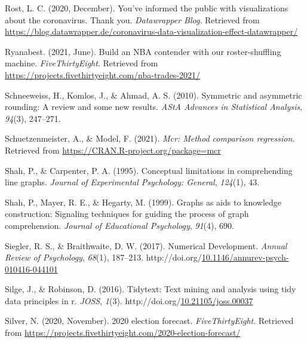 \documentclass[print]{nuthesis}
\newlength{\cslhangindent}
\newenvironment{CSLReferences}%
{\setlength{\parindent}{0pt}%
\everypar{\setlength{\hangindent}{\cslhangindent}}\ignorespaces}%
{\par}
\begin{document}
\begin{CSLReferences}{1}{0}
\leavevmode{}%
Rost, L. C. (2020, December). You've informed the public with visualizations about the coronavirus. Thank you. \emph{Datawrapper Blog}. Retrieved from \url{https://blog.datawrapper.de/coronavirus-data-visualization-effect-datawrapper/}

\leavevmode{}%
Ryanabest. (2021, June). Build an NBA contender with our roster-shuffling machine. \emph{FiveThirtyEight}. Retrieved from \url{https://projects.fivethirtyeight.com/nba-trades-2021/}

\leavevmode{}%
Schneeweiss, H., Komlos, J., \& Ahmad, A. S. (2010). Symmetric and asymmetric rounding: A review and some new results. \emph{AStA Advances in Statistical Analysis}, \emph{94}(3), 247--271.

\leavevmode{}%
Schuetzenmeister, A., \& Model, F. (2021). \emph{Mcr: Method comparison regression}. Retrieved from \url{https://CRAN.R-project.org/package=mcr}

\leavevmode{}%
Shah, P., \& Carpenter, P. A. (1995). Conceptual limitations in comprehending line graphs. \emph{Journal of Experimental Psychology: General}, \emph{124}(1), 43.

\leavevmode{}%
Shah, P., Mayer, R. E., \& Hegarty, M. (1999). Graphs as aids to knowledge construction: Signaling techniques for guiding the process of graph comprehension. \emph{Journal of Educational Psychology}, \emph{91}(4), 690.

\leavevmode{}%
Siegler, R. S., \& Braithwaite, D. W. (2017). Numerical {Development}. \emph{Annual Review of Psychology}, \emph{68}(1), 187--213. http://doi.org/\href{https://doi.org/10.1146/annurev-psych-010416-044101}{10.1146/annurev-psych-010416-044101}

\leavevmode{}%
Silge, J., \& Robinson, D. (2016). Tidytext: Text mining and analysis using tidy data principles in r. \emph{JOSS}, \emph{1}(3). http://doi.org/\href{https://doi.org/10.21105/joss.00037}{10.21105/joss.00037}

\leavevmode{}%
Silver, N. (2020, November). 2020 election forecast. \emph{FiveThirtyEight}. Retrieved from \url{https://projects.fivethirtyeight.com/2020-election-forecast/}


\end{CSLReferences}
\end{document}
